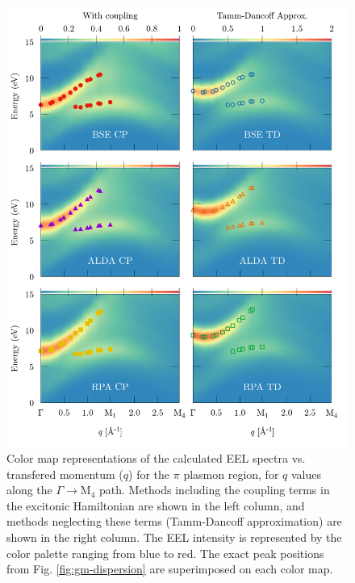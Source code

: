 \documentclass[aps,prb,10pt,showpacs,superscriptaddress,twocolumn,notitlepage]{revtex4-1}
\begin{document}
\begin{figure}[t]
\includegraphics[width=\linewidth]{fig06}
\caption{Color map representations of the calculated EEL spectra vs. transfered momentum
($q$) for the $\pi$ plasmon region, for $q$ values along the $\Gamma \rightarrow
\mathrm{M}_{4}$ path. Methods including the coupling terms in the excitonic
Hamiltonian are shown in the left column, and methods neglecting these terms
(Tamm-Dancoff approximation) are shown in the right column. The EEL intensity is
represented by the color palette ranging from blue to red.
The exact peak positions from Fig. \ref{fig:gm-dispersion} are superimposed on each color
map.}
\label{fig:gm-heatmap_lo}
\end{figure}
\end{document}
